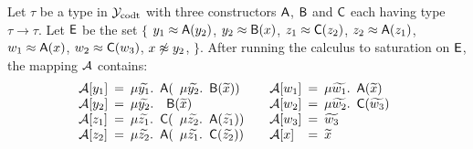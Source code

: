 \begin{example}
Let $\tau$ be a type in $\mathcal{Y}_{\mathrm{codt}}$ with three constructors $\textsf{A}$, $\textsf{B}$ and $\textsf{C}$ each having type $\tau \rightarrow \tau$.
Let $\mathsf{E}$ be the set
$\{$
$y_1 \approx \textsf{A}( y_2 )$,
$y_2 \approx \textsf{B}( x )$,
$z_1 \approx \textsf{C}( z_2 )$,
$z_2 \approx \textsf{A}( z_1 )$,
$w_1 \approx \textsf{A}( x )$,
$w_2 \approx \textsf{C}( w_3 )$,
$x \not\approx y_2$,
$\}$.
After running the calculus to saturation on $\mathsf{E}$, the mapping $\mathcal{A}$ contains:
\[\begin{array}{l@{\hspace{.5em}}l@{\hspace{.5em}}l@{\hspace{.5em}}l@{\hspace{.5em}}l@{\hspace{.5em}}l@{\hspace{2.0em}}l@{\hspace{.5em}}l@{\hspace{.5em}}l@{\hspace{.5em}}l@{\hspace{.5em}}l@{\hspace{.5em}}l@{\hspace{.5em}}l}
\Val \ec{y_1} & = & \mu {\Varec{y_1}}. & \const{A}( & \mu {\Varec{y_2}}. & \const{B}( {\Varec{x}} ) ) &
\Val \ec{w_1} & = & \mu {\Varec{w_1}}. & \const{A}( {\Varec{x}} )      & \\
\Val \ec{y_2} & = & \mu {\Varec{y_2}}. & \multicolumn{2}{l}{\const{B}( {\Varec{x}} )}      & &
\Val \ec{w_2} & = & \mu {\Varec{w_2}}. & \const{C}( {\Varec{w_3}} ) \\
\Val \ec{z_1} & = & \mu {\Varec{z_1}}. & \const{C}( & \mu {\Varec{z_2}}. & \const{A}( {\Varec{z_1}} ) ) &
\Val \ec{w_3} & = & {\Varec{w_3}} \\
\Val \ec{z_2} & = & \mu {\Varec{z_2}}. & \const{A}( & \mu {\Varec{z_1}}. & \const{C}( {\Varec{z_2}} ) ) &
\Val \ec{x} & = & {\Varec{x}} \\
\end{array}\]


\end{example}
